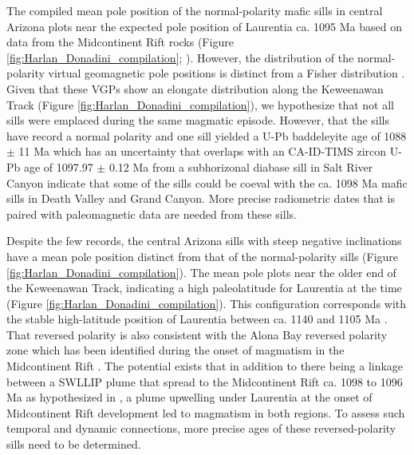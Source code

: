 The compiled mean pole position of the normal-polarity mafic sills in central Arizona plots near the expected pole position of Laurentia ca. 1095 Ma based on data from the Midcontinent Rift rocks (Figure \ref{fig:Harlan_Donadini_compilation}; \cite{Swanson-Hysell2019a}). However, the distribution of the normal-polarity virtual geomagnetic pole positions is distinct from a Fisher distribution \citep{Fisher1953a}. Given that these VGPs show an elongate distribution along the Keweenawan Track (Figure \ref{fig:Harlan_Donadini_compilation}), we hypothesize that not all sills were emplaced during the same magmatic episode. However, that the sills have record a normal polarity and one sill yielded a U-Pb baddeleyite age of 1088 $\pm$ 11 Ma \citep{Bright2014a} which has an uncertainty that overlaps with an CA-ID-TIMS zircon U-Pb age of 1097.97 $\pm$ 0.12 Ma from a subhorizonal diabase sill in Salt River Canyon \citep{Mohr2024a} indicate that some of the sills could be coeval with the ca. 1098 Ma mafic sills in Death Valley and Grand Canyon. More precise radiometric dates that is paired with paleomagnetic data are needed from these sills. 

Despite the few records, the central Arizona sills with steep negative inclinations have a mean pole position distinct from that of the normal-polarity sills (Figure \ref{fig:Harlan_Donadini_compilation}). The mean pole plots near the older end of the Keweenawan Track, indicating a high paleolatitude for Laurentia at the time (Figure \ref{fig:Harlan_Donadini_compilation}). This configuration corresponds with the stable high-latitude position of Laurentia between ca. 1140 and 1105 Ma \citep{Ernst1993a, Piispa2018a, Swanson-Hysell2021c}. That reversed polarity is also consistent with the Alona Bay reversed polarity zone which has been identified during the onset of magmatism in the Midcontinent Rift \citep{Swanson-Hysell2019a}. The potential exists that in addition to there being a linkage between a SWLLIP plume that spread to the Midcontinent Rift ca. 1098 to 1096 Ma as hypothesized in \cite{Mohr2024a}, a plume upwelling under Laurentia at the onset of Midcontinent Rift development led to magmatism in both regions. To assess such temporal and dynamic connections, more precise ages of these reversed-polarity sills need to be determined. 

